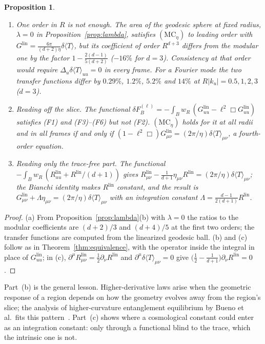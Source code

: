 \documentclass[12pt]{article}
\newtheorem{proposition}[theorem]{Proposition}
\theoremstyle{definition}
\theoremstyle{remark}
\newcommand{\Glin}{G^{\mathrm{lin}}}
\newcommand{\dT}{\delta\langle T\rangle}
\begin{document}
\begin{proposition}\label{prop:failures}
\begin{enumerate}[label=(\alph*),leftmargin=2em,itemsep=2pt]
\item \emph{One order in \(R\) is not enough.} The area of the geodesic sphere at fixed
radius, \(\lambda=0\) in Proposition~\ref{prop:lambda}, satisfies \((\mathrm{MC}_\eta)\) to
leading order with \(\Glin=\frac{6\pi}{(d+2)\eta}\dT\), but its coefficient of order
\(R^{d+3}\) differs from the modular one by the factor \(1-\frac{2(d-1)}{5(d+2)}\)
(\(-16\%\) for \(d=3\)). Consistency at that order would require \(\Delta_u\dT_{uu}=0\) in
every frame. For a Fourier mode the two transfer functions differ by \(0.29\%\), \(1.2\%\),
\(5.2\%\) and \(14\%\) at \(R|k_u|=0.5,1,2,3\) (\(d=3\)).
\item \emph{Reading off the slice.} The functional
\(\delta F^{(\ell)}_B=-\int_Bw_R\,(\Glin_{uu}-\ell^2\Box\Glin_{uu})\) satisfies
(F1) and (F3)--(F6) but not (F2). \((\mathrm{MC}_\eta)\) holds for it at all radii and in all
frames if and only if \((1-\ell^2\Box)\Glin_{\mu\nu}=(2\pi/\eta)\dT_{\mu\nu}\), a
fourth-order equation.
\item \emph{Reading only the trace-free part.} The functional
\(-\int_Bw_R\,(R^{\mathrm{lin}}_{uu}+R^{\mathrm{lin}}/(d+1))\) gives
\(R^{\mathrm{lin}}_{\mu\nu}-\frac{1}{d+1}\eta_{\mu\nu}R^{\mathrm{lin}}=(2\pi/\eta)\dT_{\mu\nu}\);
the Bianchi identity makes \(R^{\mathrm{lin}}\) constant, and the result is
\(\Glin_{\mu\nu}+\Lambda\eta_{\mu\nu}=(2\pi/\eta)\dT_{\mu\nu}\) with an integration constant
\(\Lambda=\frac{d-1}{2(d+1)}R^{\mathrm{lin}}\).
\end{enumerate}
\end{proposition}

\begin{proof}
(a) From Proposition~\ref{prop:lambda}(b) with \(\lambda=0\) the ratios to the modular
coefficients are \((d+2)/3\) and \((d+4)/5\) at the first two orders; the transfer
functions are computed from the linearized geodesic ball. (b) and (c) follow as
in Theorem~\ref{thm:equivalence}, with the operator inside the integral in place of
\(\Glin_{uu}\); in (c), \(\partial^\mu R^{\mathrm{lin}}_{\mu\nu}=\frac12\partial_\nu
R^{\mathrm{lin}}\) and \(\partial^\mu\dT_{\mu\nu}=0\) give
\(\big(\frac12-\frac1{d+1}\big)\partial_\nu R^{\mathrm{lin}}=0\).
\end{proof}

Part~(b) is the general lesson. Higher-derivative laws arise when the geometric response of
a region depends on how the geometry evolves away from the region's slice; the analysis of
higher-curvature entanglement equilibrium by Bueno et al.\ fits this
pattern~\cite{BMSV2017}. Part~(c) shows where a cosmological constant could enter as an
integration constant: only through a functional blind to the trace, which the intrinsic one
is not.
\end{document}
